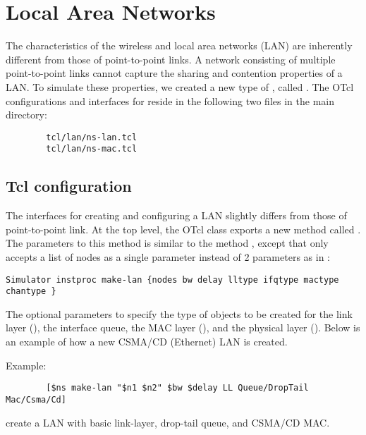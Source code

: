 %


%
%
\chapter{Local Area Networks}
\label{chap:lan}

The characteristics of the wireless and local area networks (LAN) are
inherently different from those of point-to-point links.  A network
consisting of multiple point-to-point links cannot capture the sharing
and contention properties of a LAN.  To simulate these properties, we
created a new type of , called .  The OTcl
configurations and interfaces for  reside in the following
two files in the main \ns directory:

\begin{verbatim}
        tcl/lan/ns-lan.tcl
        tcl/lan/ns-mac.tcl
\end{verbatim}

\section{Tcl configuration}
\label{sec:lan_tcl}

The interfaces for creating and configuring a LAN slightly differs from
those of point-to-point link.  At the top level, the OTcl class
 exports a new method called .  The
parameters to this method is similar to the method ,
except that  only accepts a list of nodes as a single
parameter instead of 2 parameters as in :

\begin{verbatim}
Simulator instproc make-lan {nodes bw delay lltype ifqtype mactype chantype }
\end{verbatim}

The optional parameters to  specify the type of objects
to be created for the link layer (), the interface queue, the
MAC layer (), and the physical layer ().  Below
is an example of how a new CSMA/CD (Ethernet) LAN is created.

Example:
\begin{verbatim}
        [$ns make-lan "$n1 $n2" $bw $delay LL Queue/DropTail Mac/Csma/Cd]
\end{verbatim}
create a LAN with basic link-layer, drop-tail queue, and CSMA/CD MAC.



